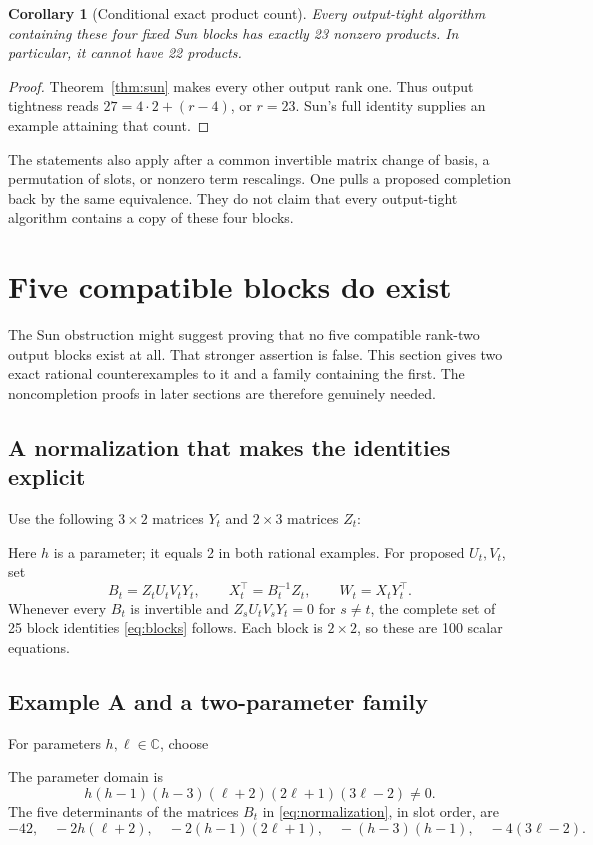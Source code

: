 \documentclass[11pt]{article}
\newtheorem{corollary}[theorem]{Corollary}
\theoremstyle{definition}\newtheorem{definition}[theorem]{Definition}
\newcommand{\C}{\mathbb C}\newcommand{\Q}{\mathbb Q}
\begin{document}
\begin{corollary}[Conditional exact product count]\label{cor:sun23}
Every output-tight algorithm containing these four fixed Sun blocks has exactly 23 nonzero products. In particular, it cannot have 22 products.
\end{corollary}
\begin{proof}
Theorem~\ref{thm:sun} makes every other output rank one. Thus output tightness reads $27=4\cdot2+(r-4)$, or $r=23$. Sun's full identity supplies an example attaining that count.
\end{proof}

The statements also apply after a common invertible matrix change of basis, a permutation of slots, or nonzero term rescalings. One pulls a proposed completion back by the same equivalence. They do not claim that every output-tight algorithm contains a copy of these four blocks.

\section{Five compatible blocks do exist}\label{sec:five}
The Sun obstruction might suggest proving that no five compatible rank-two output blocks exist at all. That stronger assertion is false. This section gives two exact rational counterexamples to it and a family containing the first. The noncompletion proofs in later sections are therefore genuinely needed.

\subsection{A normalization that makes the identities explicit}
Use the following $3\times2$ matrices $Y_t$ and $2\times3$ matrices $Z_t$:

Here $h$ is a parameter; it equals 2 in both rational examples. For proposed $U_t,V_t$, set
\begin{equation}\label{eq:normalization}
B_t=Z_tU_tV_tY_t,\qquad
X_t^\top=B_t^{-1}Z_t,\qquad W_t=X_tY_t^\top.
\end{equation}
Whenever every $B_t$ is invertible and $Z_sU_tV_sY_t=0$ for $s\ne t$, the complete set of 25 block identities \eqref{eq:blocks} follows. Each block is $2\times2$, so these are 100 scalar equations.

\subsection{Example A and a two-parameter family}\label{subsec:A}
For parameters $h,\ell\in\C$, choose

The parameter domain is
\begin{equation}\label{eq:familydomain}
h(h-1)(h-3)(\ell+2)(2\ell+1)(3\ell-2)\ne0.
\end{equation}
The five determinants of the matrices $B_t$ in \eqref{eq:normalization}, in slot order, are
\begin{equation}\label{eq:familydets}
-42,\quad-2h(\ell+2),\quad-2(h-1)(2\ell+1),\quad-(h-3)(h-1),\quad-4(3\ell-2).
\end{equation}
\end{document}
